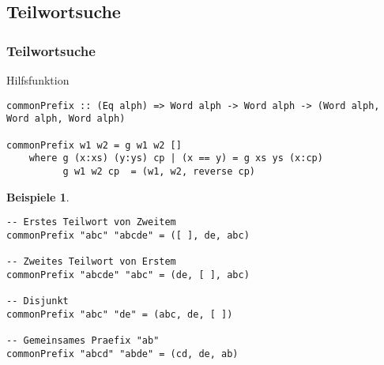 \documentclass{beamer}
\newtheorem{examplesg}{Beispiele}
\begin{document}
\subsection{Teilwortsuche}

\begin{frame}[fragile]
\frametitle{Teilwortsuche}
Hilfsfunktion
\begin{lstlisting}
commonPrefix :: (Eq alph) => Word alph -> Word alph -> (Word alph, Word alph, Word alph)

commonPrefix w1 w2 = g w1 w2 []
    where g (x:xs) (y:ys) cp | (x == y) = g xs ys (x:cp)
          g w1 w2 cp  = (w1, w2, reverse cp)
\end{lstlisting}
\begin{examplesg}
\begin{lstlisting}
-- Erstes Teilwort von Zweitem
commonPrefix "abc" "abcde" = ([ ], de, abc)

-- Zweites Teilwort von Erstem
commonPrefix "abcde" "abc" = (de, [ ], abc)

-- Disjunkt
commonPrefix "abc" "de" = (abc, de, [ ])

-- Gemeinsames Praefix "ab"
commonPrefix "abcd" "abde" = (cd, de, ab)
\end{lstlisting}
\end{examplesg}
\end{frame}
\end{document}
